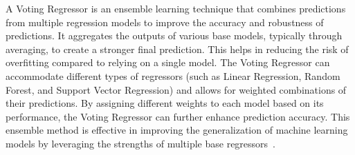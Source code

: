 A Voting Regressor is an ensemble learning technique that combines predictions from multiple regression models to improve
the accuracy and robustness of predictions. It aggregates the outputs of various base models, typically through averaging,
to create a stronger final prediction. This helps in reducing the risk of overfitting compared to relying on a single model.
The Voting Regressor can accommodate different types of regressors (such as Linear Regression, Random Forest, and Support
Vector Regression) and allows for weighted combinations of their predictions. By assigning different weights to each model
based on its performance, the Voting Regressor can further enhance prediction accuracy. This ensemble method is effective
in improving the generalization of machine learning models by leveraging the strengths of multiple base
regressors\ \cite{votingRegressorMedium}.
